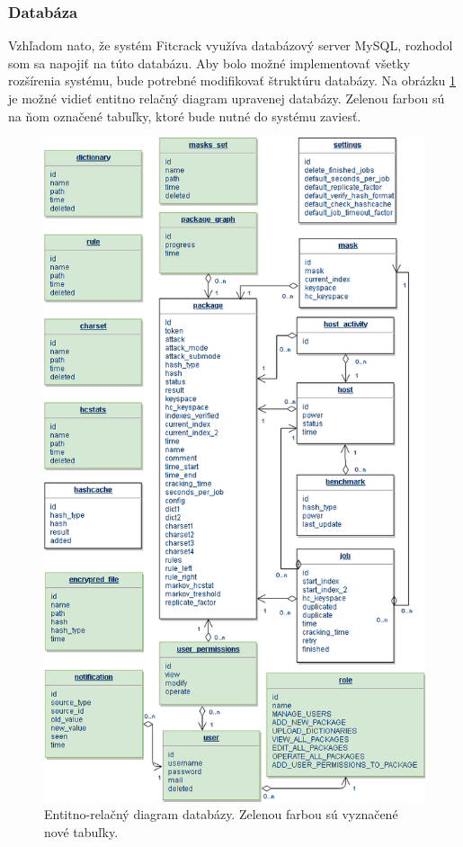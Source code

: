 \documentclass[slovak]{fitthesis}
\begin{document}
\subsubsection{Databáza}\label{navrhDB}
Vzhľadom nato, že systém Fitcrack využíva databázový server MySQL, rozhodol som sa napojiť na túto databázu. Aby bolo možné implementovať všetky rozšírenia systému, bude potrebné modifikovať štruktúru databázy. Na obrázku \ref{fig:ER} je možné vidieť entitno relačný diagram upravenej databázy. Zelenou farbou sú na ňom označené tabuľky, ktoré bude nutné do systému zaviesť. 

\begin{figure}[H]
    \centering
    \includegraphics[scale=0.58]{obrazky/ER.PNG}
    \caption{Entitno-relačný diagram databázy. Zelenou farbou sú vyznačené nové tabuľky.}
    \label{fig:ER}
\end{figure}
\end{document}
